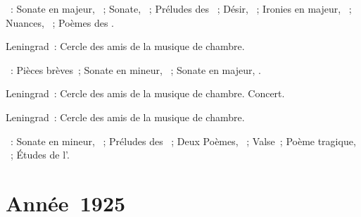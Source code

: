 \begin{description}
 \textsc{\Scriabine{}}~: Sonate en \kF \Sharp majeur, ~; Sonate,
 ~; Préludes des ~; Désir, 
 ~; Ironies en \kC majeur,  ~; Nuances,
  ~; Poèmes des .
 \item[\DateWithWeekDay{1924-08-22}]
 Leningrad~: Cercle des amis de la musique de chambre.

 \textsc{\Scriabine{}}~: Pièces brèves~; Sonate en \kF \Sharp mineur,
 ~; Sonate en \kF \Sharp majeur, .
 \item[\DateWithWeekDay{1924-08-26}]
 Leningrad~: Cercle des amis de la musique de chambre.
 Concert.
 \item[\DateWithWeekDay{1924-09-21}]
 Leningrad~: Cercle des amis de la musique de chambre.

 \textsc{\Scriabine{}}~: Sonate en \kF \Sharp mineur, ~; Préludes
 des ~; Deux Poèmes, ~; Valse~;
 Poème tragique, ~; Études de l'.
\end{description}

\section{Année~1925}

